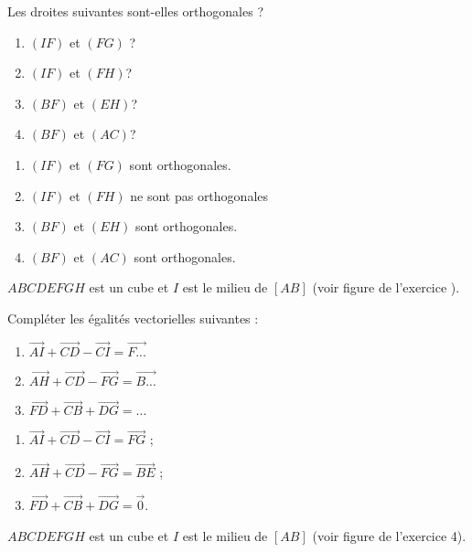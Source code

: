 \documentclass{cornouaille}
\begin{document}
\begin{colonne*exercice}
\begin{exercice*}
  Les droites suivantes sont-elles orthogonales ?
  \begin{enumerate}
  \item $(IF)$ et $(FG)$ ?
  \item $(IF)$ et $(FH)$?
  \item $(BF)$ et $(EH)$?
  \item $(BF)$ et $(AC)$?
  \end{enumerate}
\end{exercice*}
\begin{corrige}
  \begin{enumerate}
\item  $(IF)$ et $(FG)$ sont orthogonales.
\item  $(IF)$ et $(FH)$ ne sont pas orthogonales
\item  $(BF)$ et $(EH)$ sont orthogonales.
\item  $(BF)$ et $(AC)$ sont orthogonales.
\end{enumerate}
\end{corrige}

\begin{exercice*}
  $ABCDEFGH$ est un cube et $I$ est le milieu de $[AB]$ (voir figure
  de l'exercice ).

  Compléter les égalités vectorielles suivantes :
  \begin{enumerate}
  \item
    $\overrightarrow{AI}+\overrightarrow{CD}-\overrightarrow{CI}=\overrightarrow{F...}$
  \item
    $\overrightarrow{AH}+\overrightarrow{CD}-\overrightarrow{FG}=\overrightarrow{B...}$
  \item
    $\overrightarrow{FD}+\overrightarrow{CB}+\overrightarrow{DG} =...$
  \end{enumerate}
\end{exercice*}
\begin{corrige}
  \begin{enumerate}
\item  $\overrightarrow{AI}+\overrightarrow{CD}-\overrightarrow{CI}=\overrightarrow{FG}$ ;
\item $\overrightarrow{AH}+\overrightarrow{CD}-\overrightarrow{FG}=\overrightarrow{BE}$ ;
\item $\overrightarrow{FD}+\overrightarrow{CB}+\overrightarrow{DG} =\overrightarrow{0}$.
 \end{enumerate}
\end{corrige}

\begin{exercice*}
  $ABCDEFGH$ est un cube et $I$ est le milieu de $[AB]$ (voir figure
  de l'exercice 4).


\end{exercice*}
\end{colonne*exercice}
\end{document}
